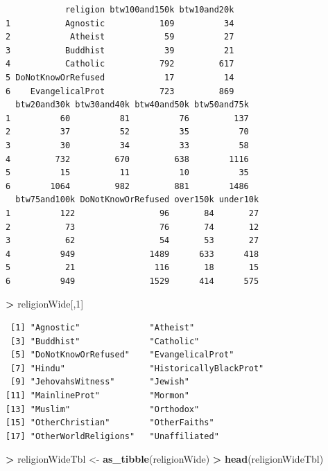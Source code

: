 \documentclass[]{krantz}
\makeatletter
\newenvironment{Shaded}{\begin{snugshade}}{\end{snugshade}}
\newcommand{\KeywordTok}[1]{\textcolor[rgb]{0.27,0.27,0.27}{\textbf{#1}}}
\newcommand{\DecValTok}[1]{\textcolor[rgb]{0.06,0.06,0.06}{#1}}
\newcommand{\StringTok}[1]{\textcolor[rgb]{0.5,0.5,0.5}{#1}}
\newcommand{\OperatorTok}[1]{\textcolor[rgb]{0.43,0.43,0.43}{\textbf{#1}}}
\newcommand{\NormalTok}[1]{#1}
\newenvironment{kframe}{%
\medskip{}
\setlength{\fboxsep}{.8em}
 \def\at@end@of@kframe{}%
 \ifinner\ifhmode%
  \def\at@end@of@kframe{\end{minipage}}%
  \begin{minipage}{\columnwidth}%
 \fi\fi%
 \def\FrameCommand##1{\hskip\@totalleftmargin \hskip-\fboxsep
 \colorbox{shadecolor}{##1}\hskip-\fboxsep
     \hskip-\linewidth \hskip-\@totalleftmargin \hskip\columnwidth}%
 \MakeFramed {\advance\hsize-\width
   \@totalleftmargin\z@ \linewidth\hsize
   \@setminipage}}%
 {\par\unskip\endMakeFramed%
 \at@end@of@kframe}
\renewenvironment{Shaded}{\begin{kframe}}{\end{kframe}}
\makeatother
\begin{document}
\begin{verbatim}
            religion btw100and150k btw10and20k
1           Agnostic           109          34
2            Atheist            59          27
3           Buddhist            39          21
4           Catholic           792         617
5 DoNotKnowOrRefused            17          14
6    EvangelicalProt           723         869
  btw20and30k btw30and40k btw40and50k btw50and75k
1          60          81          76         137
2          37          52          35          70
3          30          34          33          58
4         732         670         638        1116
5          15          11          10          35
6        1064         982         881        1486
  btw75and100k DoNotKnowOrRefused over150k under10k
1          122                 96       84       27
2           73                 76       74       12
3           62                 54       53       27
4          949               1489      633      418
5           21                116       18       15
6          949               1529      414      575
\end{verbatim}

\begin{Shaded}
\begin{Highlighting}[]
\OperatorTok{>}\StringTok{ }\NormalTok{religionWide[,}\DecValTok{1}\NormalTok{]}
\end{Highlighting}
\end{Shaded}

\begin{verbatim}
 [1] "Agnostic"              "Atheist"              
 [3] "Buddhist"              "Catholic"             
 [5] "DoNotKnowOrRefused"    "EvangelicalProt"      
 [7] "Hindu"                 "HistoricallyBlackProt"
 [9] "JehovahsWitness"       "Jewish"               
[11] "MainlineProt"          "Mormon"               
[13] "Muslim"                "Orthodox"             
[15] "OtherChristian"        "OtherFaiths"          
[17] "OtherWorldReligions"   "Unaffiliated"         
\end{verbatim}

\begin{Shaded}
\begin{Highlighting}[]
\OperatorTok{>}\StringTok{ }\NormalTok{religionWideTbl <-}\StringTok{ }\KeywordTok{as_tibble}\NormalTok{(religionWide)}
\OperatorTok{>}\StringTok{ }\KeywordTok{head}\NormalTok{(religionWideTbl)}
\end{Highlighting}
\end{Shaded}
\end{document}

